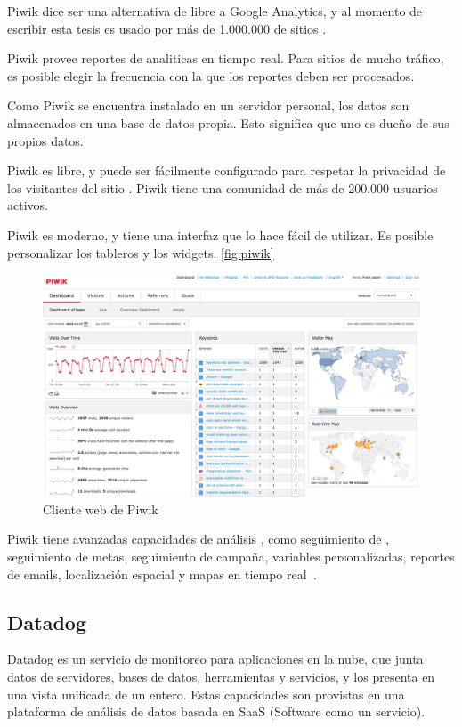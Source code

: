 Piwik dice ser una alternativa de  libre a Google Analytics, y al
momento de escribir esta tesis es usado por más de 1.000.000 de sitios
.

Piwik provee reportes de analiticas  en tiempo real. Para sitios
 de mucho tráfico, es posible elegir la frecuencia con la que los
reportes deben ser procesados.

Como Piwik se encuentra instalado en un servidor personal, los datos son
almacenados en una base de datos propia. Esto significa que uno es dueño de sus
propios datos.

Piwik es  libre, y puede ser fácilmente configurado para respetar
la privacidad de los visitantes del sitio . Piwik tiene una comunidad
de más de 200.000 usuarios activos.

Piwik es moderno, y tiene una interfaz que lo hace fácil de utilizar. Es
posible personalizar los tableros y los widgets. \autoref{fig:piwik}

\begin{figure}
  \includegraphics[width=\linewidth]{src/images/anexos/piwik.png}
  \caption{Cliente web de Piwik}
  \label{fig:piwik}
\end{figure}

Piwik tiene avanzadas capacidades de análisis , como seguimiento de
, seguimiento de metas, seguimiento de campaña, variables
personalizadas, reportes de emails, localización espacial y mapas en tiempo
real~\cite{piwik}.

\subsection{Datadog}

Datadog es un servicio de monitoreo para aplicaciones en la nube, que junta
datos de servidores, bases de datos, herramientas y servicios, y los presenta
en una vista unificada de un  entero. Estas capacidades son provistas
en una plataforma de análisis de datos basada en SaaS (Software como un
servicio).

